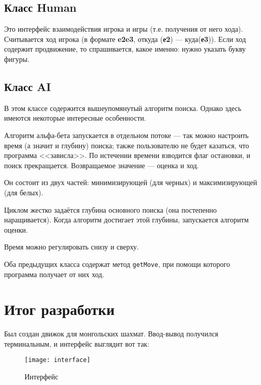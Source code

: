 \subsection*{Класс Human}

Это интерфейс взаимодействия игрока и игры (т.е. получения от него хода). Считывается ход игрока (в формате \textbf{e2e3}, откуда (\textbf{е2}) --- куда(\textbf{е3})). Если ход содержит продвижение, то спрашивается, какое именно: нужно указать букву фигуры.

\subsection*{Класс AI}

В этом классе содержится вышеупомянутый алгоритм поиска.  Однако здесь имеются некоторые интересные особенности.

Алгоритм альфа-бета запускается в отдельном потоке --- так можно настроить время (а значит и глубину) поиска; также пользователю не будет казаться, что программа <<зависла>>. По истечении времени взводится флаг остановки, и поиск прекращается. Возвращаемое значение --- оценка и ход.

Он состоит из двух частей: минимизирующей (для черных) и максимизирующей (для белых).

Циклом жестко задаётся глубина основного поиска (она постепенно наращивается). Когда алгоритм достигает этой глубины, запускается алгоритм оценки.

Время можно регулировать снизу и сверху.

Оба предыдущих класса содержат метод \texttt{getMove}, при помощи которого программа получает от них ход.

\section{Итог разработки}

Был создан движок для монгольских шахмат. Ввод-вывод получился терминальным, и интерфейс выглядит вот так: 

\begin{figure}[h]
	\centering
	\texttt{[image: interface]}
	\caption{Интерфейс}
	\label{fig: interface}
\end{figure}